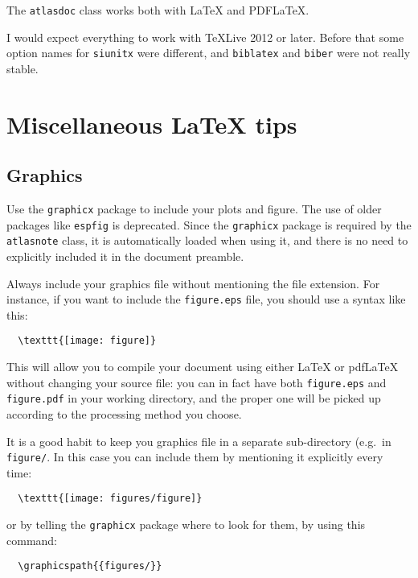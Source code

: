 \documentclass[UKenglish]{style/atlasdoc}
\begin{document}
The \texttt{atlasdoc} class works both with \LaTeX{} and PDF\LaTeX{}.

I would expect everything to work with TeXLive 2012 or later.
Before that some option names for \texttt{siunitx} were different, and \texttt{biblatex} and \texttt{biber}
were not really stable.


\section{Miscellaneous \LaTeX{} tips}
\label{sec:latex}

\subsection{Graphics}

Use the {\tt graphicx} package \cite{} to include your plots and
figure. The use of older packages like {\tt espfig} is deprecated.
Since the {\tt graphicx} package is required by the {\tt atlasnote}
class, it is automatically loaded when using it, and there is no need
to explicitly included it in the document preamble.

Always include your graphics file without mentioning the file
extension. For instance, if you want to include the \texttt{figure.eps}
file, you should use a syntax like this:
\begin{verbatim}
  \texttt{[image: figure]}
\end{verbatim}
This will allow you to compile your document using either \LaTeX{} or
pdf\LaTeX{} without changing your source file: you can in fact have
both \texttt{figure.eps} and \texttt{figure.pdf} in your working directory,
and the proper one will be picked up according to the processing method
you choose.

It is a good habit to keep you graphics file in a separate
sub-directory (e.g.\ in \texttt{figure/}. In this case you can include them
by mentioning it explicitly every time:
\begin{verbatim}
  \texttt{[image: figures/figure]}
\end{verbatim}
or by telling the \texttt{graphicx} package where to look
for them, by using this command:
\begin{verbatim}
  \graphicspath{{figures/}}
\end{verbatim}
\end{document}
